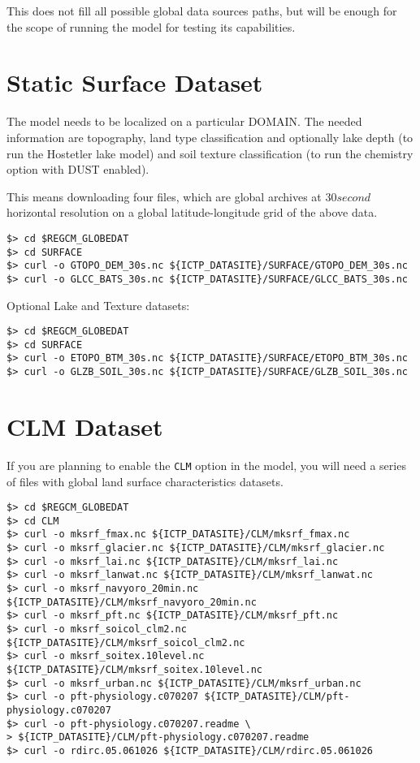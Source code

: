 This does not fill all possible global data sources paths, but will be enough
for the scope of running the model for testing its capabilities.

\section{Static Surface Dataset}

The model needs to be localized on a particular DOMAIN. The needed information
are topography, land type classification and optionally lake depth (to run the
Hostetler lake model) and soil texture classification (to run the chemistry option
with DUST enabled).

This means downloading four files, which are global archives at $30 second$
horizontal resolution on a global latitude-longitude grid of the above data.

\begin{Verbatim}
$> cd $REGCM_GLOBEDAT
$> cd SURFACE
$> curl -o GTOPO_DEM_30s.nc ${ICTP_DATASITE}/SURFACE/GTOPO_DEM_30s.nc
$> curl -o GLCC_BATS_30s.nc ${ICTP_DATASITE}/SURFACE/GLCC_BATS_30s.nc
\end{Verbatim}

Optional Lake and Texture datasets:

\begin{Verbatim}
$> cd $REGCM_GLOBEDAT
$> cd SURFACE
$> curl -o ETOPO_BTM_30s.nc ${ICTP_DATASITE}/SURFACE/ETOPO_BTM_30s.nc
$> curl -o GLZB_SOIL_30s.nc ${ICTP_DATASITE}/SURFACE/GLZB_SOIL_30s.nc
\end{Verbatim}

\section{CLM Dataset}
\label{clmdata}

If you are planning to enable the \verb=CLM= option in the model, you will need
a series of files with global land surface characteristics datasets.

\begin{Verbatim}
$> cd $REGCM_GLOBEDAT
$> cd CLM
$> curl -o mksrf_fmax.nc ${ICTP_DATASITE}/CLM/mksrf_fmax.nc
$> curl -o mksrf_glacier.nc ${ICTP_DATASITE}/CLM/mksrf_glacier.nc
$> curl -o mksrf_lai.nc ${ICTP_DATASITE}/CLM/mksrf_lai.nc
$> curl -o mksrf_lanwat.nc ${ICTP_DATASITE}/CLM/mksrf_lanwat.nc
$> curl -o mksrf_navyoro_20min.nc ${ICTP_DATASITE}/CLM/mksrf_navyoro_20min.nc
$> curl -o mksrf_pft.nc ${ICTP_DATASITE}/CLM/mksrf_pft.nc
$> curl -o mksrf_soicol_clm2.nc ${ICTP_DATASITE}/CLM/mksrf_soicol_clm2.nc
$> curl -o mksrf_soitex.10level.nc ${ICTP_DATASITE}/CLM/mksrf_soitex.10level.nc
$> curl -o mksrf_urban.nc ${ICTP_DATASITE}/CLM/mksrf_urban.nc
$> curl -o pft-physiology.c070207 ${ICTP_DATASITE}/CLM/pft-physiology.c070207
$> curl -o pft-physiology.c070207.readme \
> ${ICTP_DATASITE}/CLM/pft-physiology.c070207.readme
$> curl -o rdirc.05.061026 ${ICTP_DATASITE}/CLM/rdirc.05.061026
\end{Verbatim}

